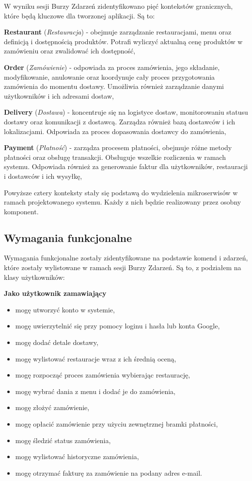 W wyniku sesji Burzy Zdarzeń zidentyfikowano pięć kontekstów granicznych, które będą kluczowe dla tworzonej aplikacji. Są to:

\textbf{Restaurant} (\textit{Restauracja}) - obejmuje zarządzanie restauracjami, menu oraz definicją i dostępnością produktów. Potrafi wyliczyć aktualną cenę produktów w zamówieniu oraz zwalidować ich dostępność,

\textbf{Order} (\textit{Zamówienie}) - odpowiada za proces zamówienia, jego składanie, modyfikowanie, anulowanie oraz koordynuje cały proces przygotowania zamówienia do momentu dostawy. Umożliwia również zarządzanie danymi użytkowników i ich adresami dostaw,

\textbf{Delivery} (\textit{Dostawa}) - koncentruje się na logistyce dostaw, monitorowaniu statusu dostawy oraz komunikacji z dostawcą. Zarządza również bazą dostawców i ich lokalizacjami. Odpowiada za proces dopasowania dostawcy do zamówienia,

\textbf{Payment} (\textit{Płatność}) - zarządza procesem płatności, obejmuje różne metody płatności oraz obsługę transakcji. Obsługuje wszelkie rozliczenia w ramach systemu. Odpowiada również za generowanie faktur dla użytkowników, restauracji i dostawców i ich wysyłkę,

\medskip

Powyższe cztery konteksty stały się podstawą do wydzielenia mikroserwisów w ramach projektowanego systemu. Każdy z nich będzie realizowany przez osobny komponent.

\subsection{Wymagania funkcjonalne}

Wymagania funkcjonalne zostały zidentyfikowane na podstawie komend i zdarzeń, które zostały wylistowane w ramach sesji Burzy Zdarzeń. Są to, z podziałem na klasy użytkowników:

\medskip

\textbf{Jako użytkownik zamawiający}
\begin{itemize}
    \item mogę utworzyć konto w systemie,
    \item mogę uwierzytelnić się przy pomocy loginu i hasła lub konta Google,
    \item mogę dodać detale dostawy,
    \item mogę wylistować restauracje wraz z ich średnią oceną,
    \item mogę rozpocząć proces zamówienia wybierając restaurację,
    \item mogę wybrać dania z menu i dodać je do zamówienia,
    \item mogę złożyć zamówienie,
    \item mogę opłacić zamówienie przy użyciu zewnętrznej bramki płatności,
    \item mogę śledzić status zamówienia,
    \item mogę wylistować historyczne zamówienia,
    \item mogę otrzymać fakturę za zamówienie na podany adres e-mail.
\end{itemize}

